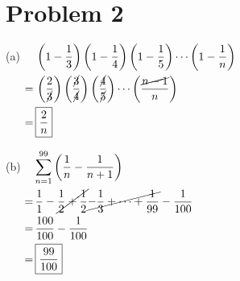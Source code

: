 \documentclass{article}
\begin{document}
\section*{Problem 2}
\begin{itemize}
\centering
\begin{minipage}[t]{0.55\linewidth}
\setlength{\abovedisplayskip}{0pt}
\item[(a)]
$\begin{aligned}[t]
	&\left(1-\frac{1}{3}\right)\left(1-\frac{1}{4}\right)\left(
		1-\frac{1}{5}\right)\cdots\left(1-\frac{1}{n}\right) \\
	=\,&\left(\frac{2}{\cancel{3}}\right)
		\left(\frac{\cancel{3}}{\cancel{4}}\right)
		\left(\frac{\cancel{4}}{\cancel{5}}\right)
		\cdots\left(\frac{\cancel{n-1}}{n}\right) \\
	=\,&\boxed{\frac{2}{n}}
\end{aligned}$
\end{minipage}
\begin{minipage}[t]{0.4\linewidth}
\setlength{\abovedisplayskip}{0pt}
\item[(b)]
$\begin{aligned}[t]
	&\sum_{n=1}^{99}\left(\frac{1}{n}-\frac{1}{n+1}\right) \\
	=&\,\frac{1}{1}-\cancel{\frac{1}{2}+\frac{1}{2}}\cancel{
		-\frac{1}{3}+\cdots+\frac{1}{99}}-\frac{1}{100} \\
	=&\,\frac{100}{100}-\frac{1}{100} \\
	=&\,\boxed{\frac{99}{100}}
\end{aligned}$
\end{minipage}
\flushleft


\end{itemize}
\end{document}
